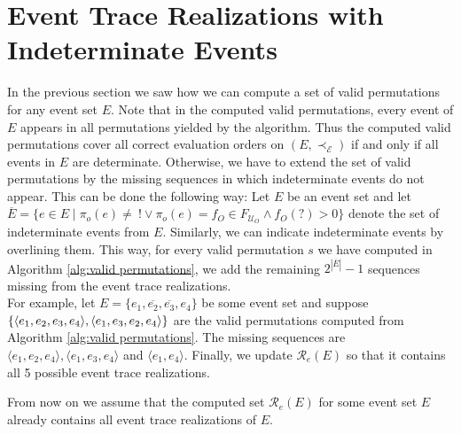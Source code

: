 \section{Event Trace Realizations with Indeterminate Events}
In the previous section we saw how we can compute a set of valid permutations for any event set $E$.
Note that in the computed valid permutations, every event of $E$ appears in all permutations yielded by the algorithm.
Thus the computed valid permutations cover all correct evaluation orders on $(E, \prec_{\mathcal{E}})$ if and only if all events in $E$ are determinate.
Otherwise, we have to extend the set of valid permutations by the missing sequences in which indeterminate events do not appear.
This can be done the following way:
Let $E$ be an event set and let $\overline{E}=\{e \in E \mid \pi_o(e) \neq  ~! \vee \pi_o(e)=f_O \in F_{\mathcal{U}_O} \wedge f_O(?) > 0 \}$ denote the set of indeterminate events from $E$.
Similarly, we can indicate indeterminate events by overlining them. 
This way, for every valid permutation $s$ we have computed in Algorithm \ref{alg:valid permutations}, we add the remaining $2^{|\overline{E}|} - 1 $ sequences missing from the event trace realizations. \\ 
%
For example, let
$E=\{e_1,\overline{e_2},\overline{e_3},e_4\}$ be some event set and suppose 
$\{ \langle e_1,e_2,e_3,e_4 \rangle, \\ 
\langle e_1,e_3,e_2,e_4 \rangle \}$
are the valid permutations computed from Algorithm \ref{alg:valid permutations}.
The missing sequences are $\langle e_1, e_2, e_4 \rangle, \langle e_1, e_3, e_4 \rangle$ and $\langle e_1, e_4 \rangle$.
Finally, we update $\mathcal{R}_e(E)$ so that it contains all 5 possible event trace realizations.

From now on we assume that the computed set $\mathcal{R}_e(E)$ for some event set $E$ already contains all event trace realizations of $E$.
%
%
%
%
%
%
%
